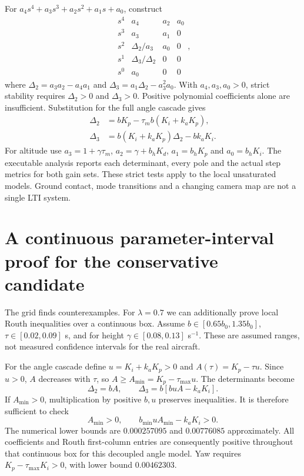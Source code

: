 For $a_4s^4+a_3s^3+a_2s^2+a_1s+a_0$, construct
\begin{equation}
\begin{array}{c|ccc}
s^4&a_4&a_2&a_0\\s^3&a_3&a_1&0\\
s^2&\Delta_2/a_3&a_0&0\\
s^1&\Delta_3/\Delta_2&0&0\\s^0&a_0&0&0
\end{array},
\end{equation}
where $\Delta_2=a_3a_2-a_4a_1$ and
$\Delta_3=a_1\Delta_2-a_3^2a_0$. With $a_4,a_3,a_0>0$, strict stability
requires $\Delta_2>0$ and $\Delta_3>0$. Positive polynomial coefficients alone
are insufficient. Substitution for the full angle cascade gives
\begin{align}
\Delta_2&=bK_p-\tau_mb(K_i+k_aK_p),\\
\Delta_3&=b(K_i+k_aK_p)\Delta_2-bk_aK_i.
\end{align}
For altitude use $a_3=1+\gamma\tau_m$, $a_2=\gamma+b_hK_d$,
$a_1=b_hK_p$ and $a_0=b_hK_i$. The executable analysis reports each
determinant, every pole and the actual step metrics for both gain sets.
These strict tests apply to the local unsaturated models. Ground contact,
mode transitions and a changing camera map are not a single LTI system.

\section{A continuous parameter-interval proof for the conservative candidate}
The grid finds counterexamples. For $\lambda=0.7$ we can additionally prove
local Routh inequalities over a continuous box. Assume
$b\in[0.65b_0,1.35b_0]$, $\tau\in[0.02,0.09]$ s, and for height
$\gamma\in[0.08,0.13]$ s$^{-1}$. These are assumed ranges, not measured
confidence intervals for the real aircraft.

For the angle cascade define $u=K_i+k_aK_p>0$ and
$A(\tau)=K_p-\tau u$. Since $u>0$, $A$ decreases with $\tau$, so
$A\geq A_{\min}=K_p-\tau_{\max}u$. The determinants become
\begin{equation}
\Delta_2=bA,\qquad\Delta_3=b[buA-k_aK_i].
\end{equation}
If $A_{\min}>0$, multiplication by positive $b,u$ preserves inequalities.
It is therefore sufficient to check
\begin{equation}
A_{\min}>0,\qquad b_{\min}uA_{\min}-k_aK_i>0.
\end{equation}
The numerical lower bounds are $0.000257095$ and $0.00776085$ approximately.
All coefficients and Routh first-column entries are consequently positive
throughout that continuous box for this decoupled angle model. Yaw requires
$K_p-\tau_{\max}K_i>0$, with lower bound $0.00462303$.

